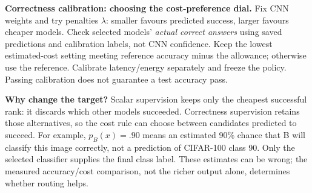 \documentclass[10pt,a4paper]{article}
\begin{document}
\textbf{Correctness calibration: choosing the cost-preference dial.} Fix CNN weights and try penalties $\lambda$: smaller favours predicted success, larger favours cheaper models. Check selected models' \emph{actual correct answers} using saved predictions and calibration labels, not CNN confidence. Keep the lowest estimated-cost setting meeting reference accuracy minus the allowance; otherwise use the reference. Calibrate latency/energy separately and freeze the policy. Passing calibration does not guarantee a test accuracy pass.

\textbf{Why change the target?} Scalar supervision keeps only the cheapest successful rank: it discards which other models succeeded. Correctness supervision retains those alternatives, so the cost rule can choose between candidates predicted to succeed. For example, $p_B(x)=.90$ means an estimated 90\% chance that B will classify this image correctly, not a prediction of CIFAR-100 class 90. Only the selected classifier supplies the final class label. These estimates can be wrong; the measured accuracy/cost comparison, not the richer output alone, determines whether routing helps.

\begin{center}
\end{center}
\end{document}
